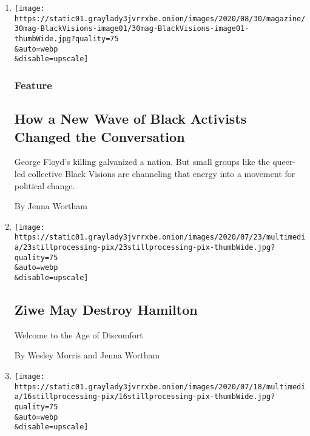 \begin{enumerate}
\def\labelenumi{\arabic{enumi}.}
\item
  \href{/2020/08/25/magazine/black-visions-collective.html}{}

  \texttt{[image: https://static01.graylady3jvrrxbe.onion/images/2020/08/30/magazine/30mag-BlackVisions-image01/30mag-BlackVisions-image01-thumbWide.jpg?quality=75\\\&auto=webp\\\&disable=upscale]}

  \hypertarget{feature}{%
  \subsubsection{Feature}\label{feature}}

  \hypertarget{how-a-new-wave-of-black-activists-changed-the-conversation}{%
  \subsection{How a New Wave of Black Activists Changed the
  Conversation}\label{how-a-new-wave-of-black-activists-changed-the-conversation}}

  George Floyd's killing galvanized a nation. But small groups like the
  queer-led collective Black Visions are channeling that energy into a
  movement for political change.

  By Jenna Wortham
\item
  \href{/2020/07/23/podcasts/hamilton-ziwe-discomfort.html}{}

  \texttt{[image: https://static01.graylady3jvrrxbe.onion/images/2020/07/23/multimedia/23stillprocessing-pix/23stillprocessing-pix-thumbWide.jpg?quality=75\\\&auto=webp\\\&disable=upscale]}

  \hypertarget{ziwe-may-destroy-hamilton}{%
  \subsection{Ziwe May Destroy
  Hamilton}\label{ziwe-may-destroy-hamilton}}

  Welcome to the Age of Discomfort

  By Wesley Morris and Jenna Wortham
\item
  \href{/2020/07/16/podcasts/reparations-for-aunt-jemima.html}{}

  \texttt{[image: https://static01.graylady3jvrrxbe.onion/images/2020/07/18/multimedia/16stillprocessing-pix/16stillprocessing-pix-thumbWide.jpg?quality=75\\\&auto=webp\\\&disable=upscale]}

  \hypertarget{reparations-for-aunt-jemima}{%
}
\end{enumerate}
